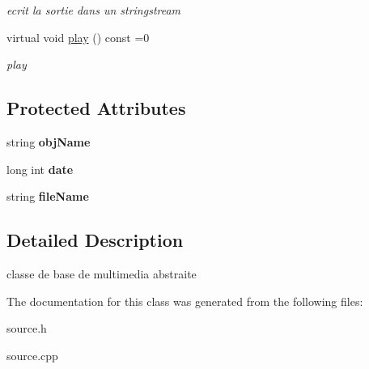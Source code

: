 \begin{DoxyCompactItemize}
\begin{DoxyCompactList}\small\item\em ecrit la sortie dans un stringstream \end{DoxyCompactList}\item 
\hypertarget{classSource_a417bae7a27d9a147482df26134400967}{virtual void \hyperlink{classSource_a417bae7a27d9a147482df26134400967}{play} () const =0}\label{classSource_a417bae7a27d9a147482df26134400967}

\begin{DoxyCompactList}\small\item\em play \end{DoxyCompactList}\end{DoxyCompactItemize}
\subsection*{Protected Attributes}
\begin{DoxyCompactItemize}
\item 
\hypertarget{classSource_a920e8bd83e0b0228fe1cb3162f5c1a02}{string {\bfseries obj\-Name}}\label{classSource_a920e8bd83e0b0228fe1cb3162f5c1a02}

\item 
\hypertarget{classSource_a636219480c2ee26eaebadc4f7d08fc68}{long int {\bfseries date}}\label{classSource_a636219480c2ee26eaebadc4f7d08fc68}

\item 
\hypertarget{classSource_aed1da03c1c13ca11fd7bb0405b555923}{string {\bfseries file\-Name}}\label{classSource_aed1da03c1c13ca11fd7bb0405b555923}

\end{DoxyCompactItemize}


\subsection{Detailed Description}
classe de base de multimedia abstraite 

The documentation for this class was generated from the following files\-:\begin{DoxyCompactItemize}
\item 
source.\-h\item 
source.\-cpp\end{DoxyCompactItemize}
